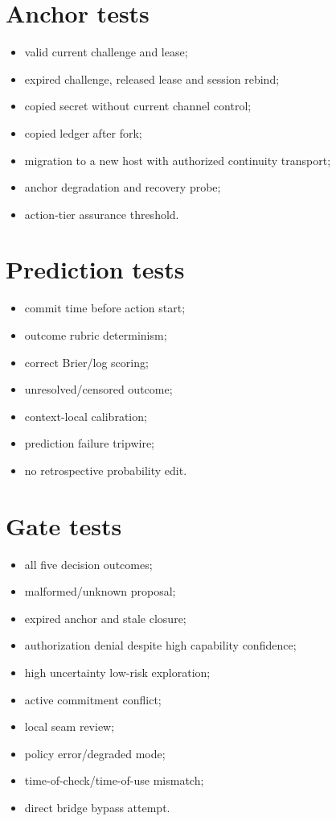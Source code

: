 \documentclass[11pt,oneside]{report}
\begin{document}
\section{Anchor tests}

\begin{itemize}
  \item valid current challenge and lease;
  \item expired challenge, released lease and session rebind;
  \item copied secret without current channel control;
  \item copied ledger after fork;
  \item migration to a new host with authorized continuity transport;
  \item anchor degradation and recovery probe;
  \item action-tier assurance threshold.
\end{itemize}

\section{Prediction tests}

\begin{itemize}
  \item commit time before action start;
  \item outcome rubric determinism;
  \item correct Brier/log scoring;
  \item unresolved/censored outcome;
  \item context-local calibration;
  \item prediction failure tripwire;
  \item no retrospective probability edit.
\end{itemize}

\section{Gate tests}

\begin{itemize}
  \item all five decision outcomes;
  \item malformed/unknown proposal;
  \item expired anchor and stale closure;
  \item authorization denial despite high capability confidence;
  \item high uncertainty low-risk exploration;
  \item active commitment conflict;
  \item local seam review;
  \item policy error/degraded mode;
  \item time-of-check/time-of-use mismatch;
  \item direct bridge bypass attempt.
\end{itemize}
\end{document}
